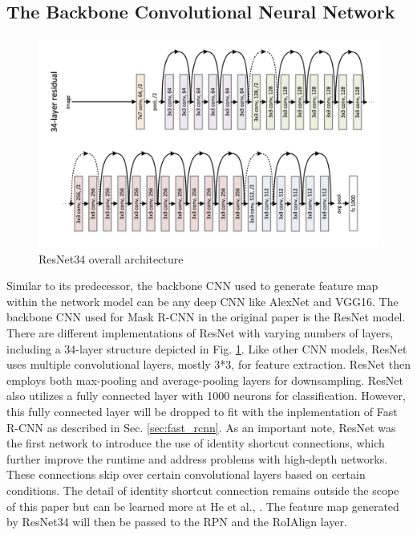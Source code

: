 \subsection{The Backbone Convolutional Neural Network}

\begin{figure}[!ht]
    \centering
    \includegraphics[width=6in]{figures/resnet34_archite.png}
    \caption{ResNet34 overall architecture \cite{resnet_2016}} \label{fig:resnet_archite}
\end{figure}

Similar to its predecessor, the backbone CNN used to generate feature map within the network model can be any deep CNN like AlexNet and VGG16. The backbone CNN used for Mask R-CNN in the original paper is the ResNet model. There are different implementations of ResNet with varying numbers of layers, including a 34-layer structure depicted in Fig. \ref{fig:resnet_archite}. Like other CNN models, ResNet uses multiple convolutional layers, mostly 3*3, for feature extraction. ResNet then employs both max-pooling and average-pooling layers for downsampling. ResNet also utilizes a fully connected layer with 1000 neurons for classification. However, this fully connected layer will be dropped to fit with the inplementation of Fast R-CNN as described in Sec. \ref{sec:fast_rcnn}. As an important note, ResNet was the first network to introduce the use of identity shortcut connections, which further improve the runtime and address problems with high-depth networks. These connections skip over certain convolutional layers based on certain conditions. The detail of identity shortcut connection remains outside the scope of this paper but can be learned more at He et al., \cite{resnet_2016}. The feature map generated by ResNet34 will then be passed to the RPN and the RoIAlign layer.

